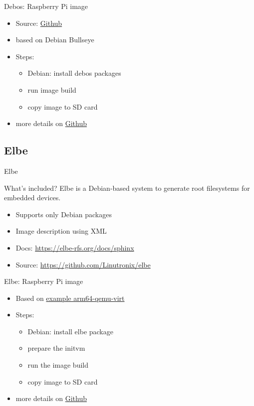 \documentclass{beamer}
\begin{document}
\begin{frame}{Debos: Raspberry Pi image}
	\begin{itemize}
		\item Source: \href{https://github.com/go-debos/debos-recipes/tree/main/rpi64}{Github}
		\item based on Debian Bullseye
		\item Steps:
		\begin{itemize}
			\item Debian: install debos packages
			\item run image build
			\item copy image to SD card
		\end{itemize}
		\item more details on \href{https://github.com/tomirgang/eh21_maintainable_linux/tree/main/examples/first_build_rpi4/debos}{Github}
	\end{itemize}
\end{frame}

\subsection{Elbe}

\begin{frame}{Elbe}
	\begin{block}{What's included?} 
		Elbe is a Debian-based system to generate root filesystems for embedded devices.
	\end{block}

	\begin{itemize}
		\item Supports only Debian packages
		\item Image description using XML
		\item Docs: \url{https://elbe-rfs.org/docs/sphinx}
		\item Source: \url{https://github.com/Linutronix/elbe}
	\end{itemize}
\end{frame}

\begin{frame}{Elbe: Raspberry Pi image}
	\begin{itemize}
		\item Based on \href{https://github.com/Linutronix/elbe/blob/master/examples/arm64-qemu-virt.xml}{example arm64-qemu-virt}
		\item Steps:
		\begin{itemize}
			\item Debian: install elbe package
			\item prepare the initvm
			\item run the image build
			\item copy image to SD card
		\end{itemize}
		\item more details on \href{https://github.com/tomirgang/eh21_maintainable_linux/tree/main/examples/first_build_rpi4/elbe}{Github}
	\end{itemize}
\end{frame}
\end{document}
